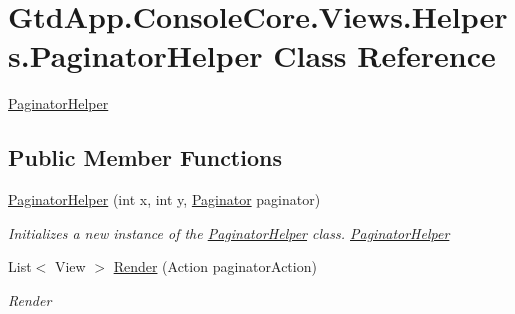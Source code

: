 \hypertarget{class_gtd_app_1_1_console_core_1_1_views_1_1_helpers_1_1_paginator_helper}{}\section{Gtd\+App.\+Console\+Core.\+Views.\+Helpers.\+Paginator\+Helper Class Reference}
\label{class_gtd_app_1_1_console_core_1_1_views_1_1_helpers_1_1_paginator_helper}


\mbox{\hyperlink{class_gtd_app_1_1_console_core_1_1_views_1_1_helpers_1_1_paginator_helper}{Paginator\+Helper}}  


\subsection*{Public Member Functions}
\begin{DoxyCompactItemize}
\item 
\mbox{\hyperlink{class_gtd_app_1_1_console_core_1_1_views_1_1_helpers_1_1_paginator_helper_ab0370893b0417c8ec00c1cfff700b437}{Paginator\+Helper}} (int x, int y, \mbox{\hyperlink{class_gtd_app_1_1_repository_1_1_paginator}{Paginator}} paginator)
\begin{DoxyCompactList}\small\item\em Initializes a new instance of the \mbox{\hyperlink{class_gtd_app_1_1_console_core_1_1_views_1_1_helpers_1_1_paginator_helper}{Paginator\+Helper}} class. \mbox{\hyperlink{class_gtd_app_1_1_console_core_1_1_views_1_1_helpers_1_1_paginator_helper}{Paginator\+Helper}} \end{DoxyCompactList}\item 
List$<$ View $>$ \mbox{\hyperlink{class_gtd_app_1_1_console_core_1_1_views_1_1_helpers_1_1_paginator_helper_abd0198f5f05005152e37087339a0a97c}{Render}} (Action paginator\+Action)
\begin{DoxyCompactList}\small\item\em Render \end{DoxyCompactList}\end{DoxyCompactItemize}

